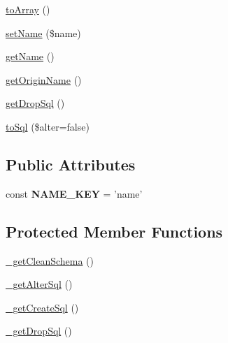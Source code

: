 \begin{DoxyCompactItemize}
\hyperlink{classZendDbSchema__Db__Schema__AbstractSchema_aa057ac85212768963047e77e9bd8550c}{to\-Array} ()
\item 
\hyperlink{classZendDbSchema__Db__Schema__AbstractSchema_a281403d9e41839e925bade11d8b69b91}{set\-Name} (\$name)
\item 
\hyperlink{classZendDbSchema__Db__Schema__AbstractSchema_a55787c21deddba427842809d589c2df6}{get\-Name} ()
\item 
\hyperlink{classZendDbSchema__Db__Schema__AbstractSchema_adacb1417b461310c5c87f72c459c1985}{get\-Origin\-Name} ()
\item 
\hyperlink{classZendDbSchema__Db__Schema__AbstractSchema_aec661ede88f500caaf2a09e98c31d3b0}{get\-Drop\-Sql} ()
\item 
\hyperlink{classZendDbSchema__Db__Schema__AbstractSchema_ada5af8e6e7a4c5407b7ca67d03900b31}{to\-Sql} (\$alter=false)
\end{DoxyCompactItemize}
\subsection*{Public Attributes}
\begin{DoxyCompactItemize}
\item 
\hypertarget{classZendDbSchema__Db__Schema__AbstractSchema_a162252fcaecf616da40f79f56262f14c}{const {\bfseries N\-A\-M\-E\-\_\-\-K\-E\-Y} = 'name'}\label{classZendDbSchema__Db__Schema__AbstractSchema_a162252fcaecf616da40f79f56262f14c}

\end{DoxyCompactItemize}
\subsection*{Protected Member Functions}
\begin{DoxyCompactItemize}
\item 
\hyperlink{classZendDbSchema__Db__Schema__AbstractSchema_af99e5bb9adfe0da8c94d3d3848efe7b5}{\-\_\-get\-Clean\-Schema} ()
\item 
\hyperlink{classZendDbSchema__Db__Schema__AbstractSchema_a2b880c7261b3f4b988f1a2b74e188c75}{\-\_\-get\-Alter\-Sql} ()
\item 
\hyperlink{classZendDbSchema__Db__Schema__AbstractSchema_a52321b7526257809f382a28a96ab562e}{\-\_\-get\-Create\-Sql} ()
\item 
\hyperlink{classZendDbSchema__Db__Schema__AbstractSchema_abf887d2836071992af679430ddf1b922}{\-\_\-get\-Drop\-Sql} ()
\end{DoxyCompactItemize}
